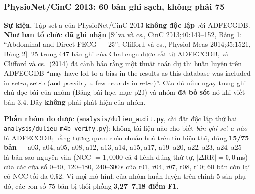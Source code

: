 \subsubsection{PhysioNet/CinC 2013: 60 bản ghi sạch, không phải 75}
\label{sec:cinc75}

\begin{canhbao}[title={RÚT LẠI (bản 3.5, vòng 7): mọi con số CinC 2013 trên 75 bản ghi trong mục này}]
\textbf{Sự kiện.} Tập set-a của PhysioNet/CinC 2013 \textbf{không độc lập} với ADFECGDB. \textbf{Như ban tổ
chức đã ghi nhận} [Silva và cs., CinC 2013;40:149--152, Bảng 1: ``Abdominal and Direct FECG --- 25'';
Clifford và cs., Physiol Meas 2014;35:1521, Bảng 2], 25 trong 447 bản ghi của Challenge được cắt từ
ADFECGDB, và Clifford và cs.\ (2014) đã cảnh báo rằng một thuật toán dự thi huấn luyện trên ADFECGDB
``may have led to a bias in the results as this database was included in set-a, set-b (and possibly a few
records in set-c)''. Câu đó nằm ngay trong ghi chú đọc bài của nhóm (Bảng bài học, mục p20) và nhóm
\textbf{đã bỏ sót} nó khi viết bản 3.4. Đây \textbf{không} phải phát hiện của nhóm.

\textbf{Phần nhóm đo được} (\texttt{analysis/dulieu\_audit.py}, cài đặt độc lập thứ hai
\texttt{analysis/dulieu\_m4b\_verify.py}): không tài liệu nào cho biết \emph{bản ghi set-a nào} là ADFECGDB;
bằng tương quan chéo chuẩn hoá trên tín hiệu thô, đúng \textbf{15/75 bản} --- a03, a04, a05, a08, a12, a13,
a14, a15, a17, a19, a20, a22, a23, a24, a25 --- là bản sao nguyên văn (NCC $= 1{,}0000$ cả 4 kênh đúng thứ
tự, $|\Delta$RR$| = 0{,}0$\,ms) của các cửa sổ 0--60, 120--180, 240--300\,s của r01, r04, r07, r08, r10; 60
bản còn lại có NCC tối đa 0,62. Vì mọi mô hình của nhóm huấn luyện trên chính 5 sản phụ đó, các con số
75 bản bị thổi phồng \textbf{3,27--7,18 điểm F1}.


\end{canhbao}
